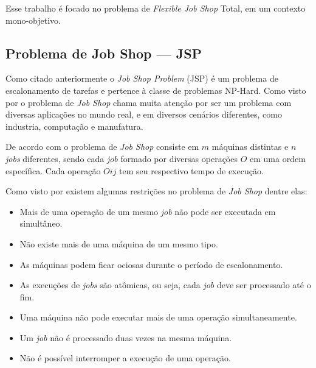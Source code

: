         Esse trabalho é focado no problema de \textit{Flexible Job Shop} Total, em um contexto mono-objetivo.


    \subsection{Problema de Job Shop — JSP}
            Como citado anteriormente o \textit{Job Shop Problem} (JSP) é um problema de escalonamento de tarefas e pertence à classe de problemas NP-Hard. Como visto por \cite{Cheng1996} o problema de \textit{Job Shop} chama muita atenção por ser um problema com diversas aplicações no mundo real, e em diversos cenários diferentes, como industria, computação e manufatura.\newline

            De acordo com \cite{Cheng1996} o problema de \textit{Job Shop} consiste em $m$ máquinas distintas e $n$ \textit{jobs} diferentes, sendo cada \textit{job} formado por diversas operações $O$ em uma ordem específica. Cada operação $Oij$ tem seu respectivo tempo de execução.\newline

            Como visto por \cite{Bagchi1999} existem algumas restrições no problema de \textit{Job Shop} dentre elas:
            \begin{itemize}
                \item Mais de uma operação de um mesmo \textit{job} não pode ser executada em simultâneo.
                \item Não existe mais de uma máquina de um mesmo tipo.
                \item As máquinas podem ficar ociosas durante o período de escalonamento.
                \item As execuções de \textit{jobs} são atômicas, ou seja, cada \textit{job} deve ser processado até o fim.
                \item Uma máquina não pode executar mais de uma operação simultaneamente.
                \item Um \textit{job} não é processado duas vezes na mesma máquina.
                \item Não é possível interromper a execução de uma operação.
            \end{itemize}
        
